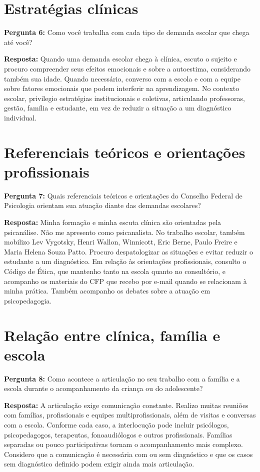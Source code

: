 \documentclass[12pt,a4paper,oneside]{abntex2}
\begin{document}
\section{Estratégias clínicas}

\noindent\textbf{Pergunta 6:} Como você trabalha com cada tipo de demanda escolar que chega até você?

\noindent\textbf{Resposta:} Quando uma demanda escolar chega à clínica, escuto o sujeito e procuro compreender seus efeitos emocionais e sobre a autoestima, considerando também sua idade. Quando necessário, converso com a escola e com a equipe sobre fatores emocionais que podem interferir na aprendizagem. No contexto escolar, privilegio estratégias institucionais e coletivas, articulando professoras, gestão, família e estudante, em vez de reduzir a situação a um diagnóstico individual.

\section{Referenciais teóricos e orientações profissionais}

\noindent\textbf{Pergunta 7:} Quais referenciais teóricos e orientações do Conselho Federal de Psicologia orientam sua atuação diante das demandas escolares?

\noindent\textbf{Resposta:} Minha formação e minha escuta clínica são orientadas pela psicanálise. Não me apresento como psicanalista. No trabalho escolar, também mobilizo Lev Vygotsky, Henri Wallon, Winnicott, Eric Berne, Paulo Freire e Maria Helena Souza Patto. Procuro despatologizar as situações e evitar reduzir o estudante a um diagnóstico. Em relação às orientações profissionais, consulto o Código de Ética, que mantenho tanto na escola quanto no consultório, e acompanho os materiais do CFP que recebo por e-mail quando se relacionam à minha prática. Também acompanho os debates sobre a atuação em psicopedagogia.

\section{Relação entre clínica, família e escola}

\noindent\textbf{Pergunta 8:} Como acontece a articulação no seu trabalho com a família e a escola durante o acompanhamento da criança ou do adolescente?

\noindent\textbf{Resposta:} A articulação exige comunicação constante. Realizo muitas reuniões com famílias, profissionais e equipes multiprofissionais, além de visitas e conversas com a escola. Conforme cada caso, a interlocução pode incluir psicólogos, psicopedagogos, terapeutas, fonoaudiólogos e outros profissionais. Famílias separadas ou pouco participativas tornam o acompanhamento mais complexo. Considero que a comunicação é necessária com ou sem diagnóstico e que os casos sem diagnóstico definido podem exigir ainda mais articulação.
\end{document}
